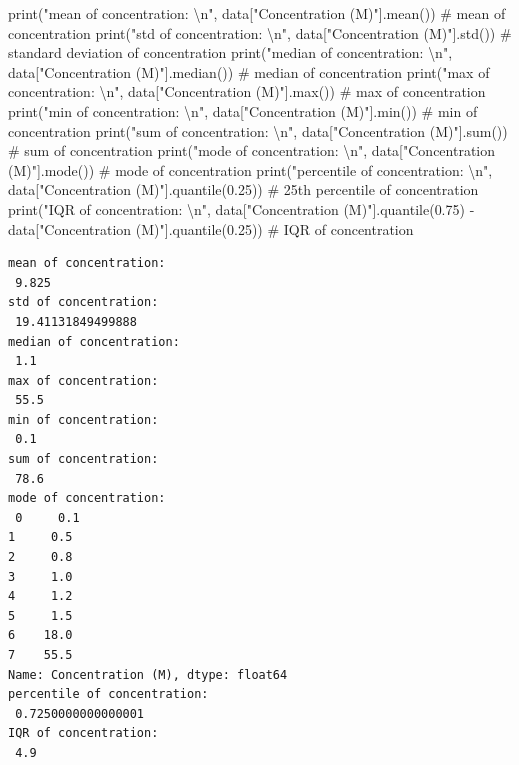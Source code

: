 \documentclass[
  letterpaper,
  DIV=11,
  numbers=noendperiod]{scrreprt}
\newenvironment{Shaded}{\begin{snugshade}}{\end{snugshade}}
\newcommand{\BuiltInTok}[1]{\textcolor[rgb]{0.00,0.23,0.31}{#1}}
\newcommand{\CharTok}[1]{\textcolor[rgb]{0.13,0.47,0.30}{#1}}
\newcommand{\CommentTok}[1]{\textcolor[rgb]{0.37,0.37,0.37}{#1}}
\newcommand{\FloatTok}[1]{\textcolor[rgb]{0.68,0.00,0.00}{#1}}
\newcommand{\NormalTok}[1]{\textcolor[rgb]{0.00,0.23,0.31}{#1}}
\newcommand{\OperatorTok}[1]{\textcolor[rgb]{0.37,0.37,0.37}{#1}}
\newcommand{\StringTok}[1]{\textcolor[rgb]{0.13,0.47,0.30}{#1}}
\begin{document}
\begin{Shaded}
\begin{Highlighting}[]
\BuiltInTok{print}\NormalTok{(}\StringTok{"mean of concentration: }\CharTok{\textbackslash{}n}\StringTok{"}\NormalTok{, data[}\StringTok{"Concentration (M)"}\NormalTok{].mean()) }\CommentTok{\# mean of concentration}
\BuiltInTok{print}\NormalTok{(}\StringTok{"std of concentration: }\CharTok{\textbackslash{}n}\StringTok{"}\NormalTok{, data[}\StringTok{"Concentration (M)"}\NormalTok{].std()) }\CommentTok{\# standard deviation of concentration}
\BuiltInTok{print}\NormalTok{(}\StringTok{"median of concentration: }\CharTok{\textbackslash{}n}\StringTok{"}\NormalTok{, data[}\StringTok{"Concentration (M)"}\NormalTok{].median()) }\CommentTok{\# median of concentration}
\BuiltInTok{print}\NormalTok{(}\StringTok{"max of concentration: }\CharTok{\textbackslash{}n}\StringTok{"}\NormalTok{, data[}\StringTok{"Concentration (M)"}\NormalTok{].}\BuiltInTok{max}\NormalTok{()) }\CommentTok{\# max of concentration}
\BuiltInTok{print}\NormalTok{(}\StringTok{"min of concentration: }\CharTok{\textbackslash{}n}\StringTok{"}\NormalTok{, data[}\StringTok{"Concentration (M)"}\NormalTok{].}\BuiltInTok{min}\NormalTok{()) }\CommentTok{\# min of concentration}
\BuiltInTok{print}\NormalTok{(}\StringTok{"sum of concentration: }\CharTok{\textbackslash{}n}\StringTok{"}\NormalTok{, data[}\StringTok{"Concentration (M)"}\NormalTok{].}\BuiltInTok{sum}\NormalTok{()) }\CommentTok{\# sum of concentration}
\BuiltInTok{print}\NormalTok{(}\StringTok{"mode of concentration: }\CharTok{\textbackslash{}n}\StringTok{"}\NormalTok{, data[}\StringTok{"Concentration (M)"}\NormalTok{].mode()) }\CommentTok{\# mode of concentration}
\BuiltInTok{print}\NormalTok{(}\StringTok{"percentile of concentration: }\CharTok{\textbackslash{}n}\StringTok{"}\NormalTok{, data[}\StringTok{"Concentration (M)"}\NormalTok{].quantile(}\FloatTok{0.25}\NormalTok{)) }\CommentTok{\# 25th percentile of concentration}
\BuiltInTok{print}\NormalTok{(}\StringTok{"IQR of concentration: }\CharTok{\textbackslash{}n}\StringTok{"}\NormalTok{, data[}\StringTok{"Concentration (M)"}\NormalTok{].quantile(}\FloatTok{0.75}\NormalTok{) }\OperatorTok{{-}}\NormalTok{ data[}\StringTok{"Concentration (M)"}\NormalTok{].quantile(}\FloatTok{0.25}\NormalTok{)) }\CommentTok{\# IQR of concentration}
\end{Highlighting}
\end{Shaded}

\begin{verbatim}
mean of concentration: 
 9.825
std of concentration: 
 19.41131849499888
median of concentration: 
 1.1
max of concentration: 
 55.5
min of concentration: 
 0.1
sum of concentration: 
 78.6
mode of concentration: 
 0     0.1
1     0.5
2     0.8
3     1.0
4     1.2
5     1.5
6    18.0
7    55.5
Name: Concentration (M), dtype: float64
percentile of concentration: 
 0.7250000000000001
IQR of concentration: 
 4.9
\end{verbatim}
\end{document}
